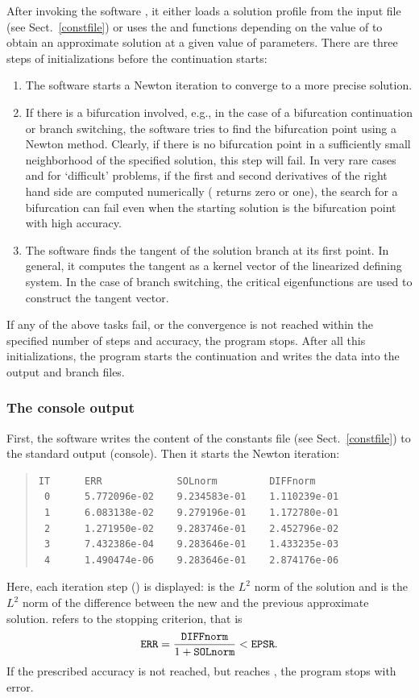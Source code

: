 \documentclass[10pt,a4paper]{ddedoc}
\begin{document}
After invoking the software , it either loads a solution profile
from the input file (see Sect.\ \ref{constfile}) or uses the 
 and  functions 
depending on the value of  to obtain an approximate solution at a
given value of parameters. There are three steps of initializations before the
continuation starts:
\begin{enumerate}
\item The software starts a Newton iteration to converge to a more precise
solution.
\item If there is a bifurcation involved, e.g., in the case of a bifurcation
continuation or branch switching, the software tries to find the bifurcation
point using a Newton method. Clearly, if there is no bifurcation point in a
sufficiently small neighborhood of the specified solution, this step will fail.
In very rare cases and for `difficult' problems, if the first and second
derivatives of the right hand side are computed numerically (
returns zero or one), the search for a bifurcation can fail even when the
starting solution is the bifurcation point with high accuracy.
\item The software finds the tangent of the solution branch at its first point. In
general, it computes the tangent as a kernel vector of the linearized defining
system. In the case of branch switching, the critical eigenfunctions are used to
construct the tangent vector.
\end{enumerate}
If any of the above tasks fail, or the convergence is not reached within the
specified number of steps and accuracy, the program stops.
After all this initializations, the program starts the continuation and writes
the data into the output and branch files.

\subsubsection{The console output}

First, the software writes the content of the constants file (see Sect.\
\ref{constfile}) to the standard output (console). Then it starts the Newton
iteration:
{ \small \begin{quote} \begin{lstlisting}[basicstyle=\tt,frame=single]
IT      ERR             SOLnorm         DIFFnorm
 0      5.772096e-02    9.234583e-01    1.110239e-01
 1      6.083138e-02    9.279196e-01    1.172780e-01
 2      1.271950e-02    9.283746e-01    2.452796e-02
 3      7.432386e-04    9.283646e-01    1.433235e-03
 4      1.490474e-06    9.283646e-01    2.874176e-06
\end{lstlisting} \end{quote} } \noindent
Here, each iteration step () is displayed:  is the $L^2$
norm of the solution and \funp{DIFFnorm} is the $L^2$ norm of the difference
between the new and the previous approximate solution. \funp{ERR} refers to the
stopping criterion, that is
\[
	{\tt ERR} = \frac{{\tt DIFFnorm}}{1+{\tt SOLnorm}} < {\tt EPSR}.
\]
If the prescribed accuracy is not reached, but  reaches ,
the program stops with error.
\end{document}
